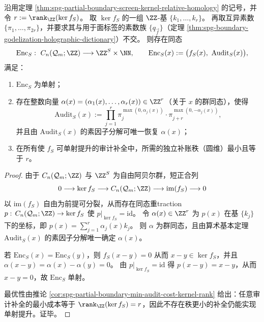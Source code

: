 \begin{theorem}\label{thm:spg-partial-boundary-godel-audit-optimal}
沿用定理 \ref{thm:spg-partial-boundary-screen-kernel-relative-homology} 的记号，并令 \(r:=\rank_{\ZZ}(\ker f_S)\)。
取 \(\ker f_S\) 的一组 \(\ZZ\)-基 \(\{k_1,\dots,k_r\}\)。
再取互异素数 \(\{\pi_1,\dots,\pi_{2r}\}\)，并要求其与用于面标签的素数族 \(\{q_{\vec f}\}\)（定理 \ref{thm:spg-boundary-godelization-holographic-dictionary}）不交。
则存在同态
\[
\mathrm{Enc}_S:\ C_n(\mathcal Q_m;\ZZ)\longrightarrow \ZZ^{S}\times \NN,
\qquad
\mathrm{Enc}_S(x):=\bigl(f_S(x),\ \mathrm{Audit}_S(x)\bigr),
\]
满足：
\begin{enumerate}
  \item \(\mathrm{Enc}_S\) 为单射；
  \item 存在整数向量 \(\alpha(x)=(\alpha_1(x),\dots,\alpha_r(x))\in\ZZ^r\)（关于 \(x\) 的群同态），使得
        \[
        \mathrm{Audit}_S(x)
        :=
        \prod_{j=1}^{r}\pi_j^{\max(0,\alpha_j(x))}\cdot \pi_{j+r}^{\max(0,-\alpha_j(x))},
        \]
        并且由 \(\mathrm{Audit}_S(x)\) 的素因子分解可唯一恢复 \(\alpha(x)\)；
  \item 在所有使 \(f_S\) 可单射提升的审计补全中，所需的独立补账秩（圆维）最小且等于 \(r\)。
\end{enumerate}
\end{theorem}
\begin{proof}
由于 \(C_n(\mathcal Q_m;\ZZ)\) 与 \(\ZZ^{S}\) 为自由阿贝尔群，短正合列
\[
0\longrightarrow \ker f_S\longrightarrow C_n(\mathcal Q_m;\ZZ)\longrightarrow \mathrm{im}(f_S)\longrightarrow 0
\]
以 \(\mathrm{im}(f_S)\) 自由为前提可分裂，从而存在同态重traction \(p:\,C_n(\mathcal Q_m;\ZZ)\to \ker f_S\) 使 \(p|_{\ker f_S}=\mathrm{id}\)。
令 \(\alpha(x)\in\ZZ^r\) 为 \(p(x)\) 在基 \(\{k_j\}\) 下的坐标，即 \(p(x)=\sum_{j=1}^r \alpha_j(x)k_j\)。
则 \(\alpha\) 为群同态，且由算术基本定理 \(\mathrm{Audit}_S(x)\) 的素因子分解唯一确定 \(\alpha(x)\)。
\par
若 \(\mathrm{Enc}_S(x)=\mathrm{Enc}_S(y)\)，则 \(f_S(x-y)=0\) 从而 \(x-y\in\ker f_S\)，并且 \(\alpha(x-y)=\alpha(x)-\alpha(y)=0\)。
由 \(p|_{\ker f_S}=\mathrm{id}\) 得 \(p(x-y)=x-y\)，从而 \(x-y=0\)，故 \(\mathrm{Enc}_S\) 单射。
\par
最优性由推论 \ref{cor:spg-partial-boundary-min-audit-cost-kernel-rank} 给出：任意审计补全的最小成本等于 \(\rank_{\ZZ}(\ker f_S)=r\)，因此不存在秩更小的补全仍能实现单射提升。证毕。
\end{proof}

